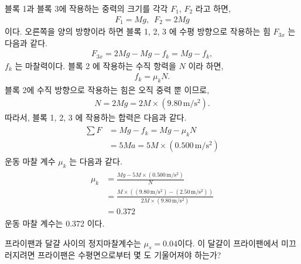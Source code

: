 \documentclass[floatfix,nofootinbib,superscriptaddress,fleqn,preprint]{revtex4}
\begin{document}
블록 1과 블록 3에 작용하는 중력의 크기를 각각 $F_1$, $F_2$ 라고 하면,
\begin{align}
  F_1 = Mg,\,\,\, F_2 = 2Mg
\end{align}
이다. 오른쪽을 양의 방향이라 하면 블록 1, 2, 3 에 수평 방향으로 작용하는 힘 $F_{3x}$ 는 
다음과 같다.
\begin{align}
  F_{3x} = 2Mg - Mg - f_k = Mg - f_k,
\end{align}
$f_k$ 는 마찰력이다. 블록 2 에 작용하는 수직 항력을 $N$ 이라 하면,
\begin{align}
  f_k = \mu_kN.
\end{align}
블록 2에 수직 방향으로 작용하는 힘은 오직 중력 뿐 이므로, 
\begin{align}
  N = 2Mg = 2M\times(9.80\,\mathrm{m/s^2}).
\end{align}
따라서, 블록 1, 2, 3 에 작용하는 합력은 다음과 같다.
\begin{align}
  \begin{split}
    \sum F &= Mg - f_k = Mg - \mu_kN \\
    &= 5Ma= 5M \times (0.500\,\mathrm{m/s^2})
  \end{split}
\end{align}
운동 마찰 계수 $\mu_k$ 는 다음과 같다.
\begin{align}
  \begin{split}
    \mu_k &= \frac{Mg - 5M \times (0.500\,\mathrm{m/s^2})}{N} \\
    &= \frac{M\times((9.80\,\mathrm{m/s^2})-(2.50\,\mathrm{m/s^2}))}
    {2M\times(9.80\,\mathrm{m/s^2})}  \\
    &= 0.372
  \end{split}
\end{align}
운동 마찰 계수는 0.372 이다.
\vspace{2cm}

 프라이팬과 달걀 사이의 정지마찰계수는
$\mu_s=0.04$이다. 이 달걀이 프라이팬에서 미끄러지려면 프라이팬은
수평면으로부터 몇 도 기울어져야 하는가?  \\
\end{document}

